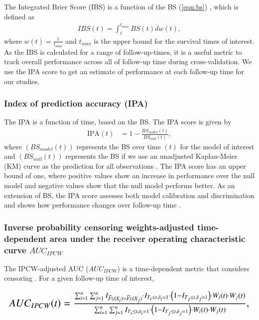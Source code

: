 \documentclass[preprint,12pt,authoryear]{elsarticle}
\begin{document}
The Integrated Brier Score (IBS) is a function of the BS (\ref{eqn:bs}) \citep{graf1999}, which is defined as \begin{align*}
IBS(t)=\int_{t}^{t_{max}}BS(t)dw(t),
\end{align*} where $w(t)=\frac{t}{t_{max}}$ and $t_{max}$ is the upper bound for the survival times of interest. As the IBS is calculated for a range of follow-up-times,
it is a useful metric to track overall performance across all of follow-up time during cross-validation. We use the
IPA score to get an estimate of performance at each follow-up time for our studies.



\hypertarget{index-of-prediction-accuracy-ipa}{%
\subsubsection{Index of prediction accuracy (IPA)}\label{index-of-prediction-accuracy-ipa}}

The IPA is a function of time, based on the BS. The IPA score is given by \begin{align}
\textrm{IPA}(t) &= 1-\frac{BS_{model}(t)}{BS_{null}(t)}, \nonumber
\end{align} where $(BS_{model}(t))$ represents the BS over time $(t)$ for the model of interest and $(BS_{null}(t))$ represents
the BS if we use an unadjusted Kaplan-Meier (KM) curve as the prediction for all observations \citep{kattan2018index}. The
IPA score has an upper bound of one, where positive values show an increase in performance over the null model and
negative values show that the null model performs better. As an extension of BS, the IPA score assesses both model calibration
and discrimination and shows how performance changes over follow-up time \citep{graf1999} \citep{kattan2018index}.




\hypertarget{auc2}{%
\subsubsection{Inverse probability censoring weights-adjusted time-dependent area under the receiver operating characteristic curve $AUC_{IPCW}$}\label{auc2}}

The IPCW-adjusted AUC ($AUC_{IPCW}$) is a time-dependent metric that considers censoring \citep{auc}. For a given follow-up time of interest,

\begin{equation*}
\resizebox{\hsize}{!}{$AUC_{IPCW}(t)=\frac{\sum^{n}_{i=1}\sum^{n}_{j=1} I_{\widehat{F}(t|X_{i})>\widehat{F}(t|X_{j})} \cdot I_{T_{i}\leq t,\delta_{i}=1} \cdot \left( 1-I_{T_{j}\leq t,\delta_{j}=1} \right) \cdot W_{i}(t) \cdot W_{j}(t)} { \sum^{n}_{i=1}\sum^{n}_{j=1} I_{T_{i}\leq t,\delta_{i}=1} \cdot \left( 1-I_{T_{j}\leq t,\delta_{j}=1} \right) \cdot W_{i}(t) \cdot W_{j}(t) },$}
\end{equation*}
\end{document}
